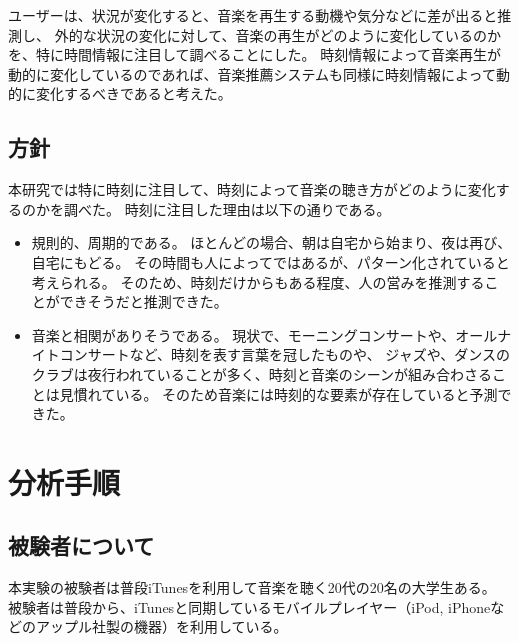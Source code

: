 \documentclass[11pt, onecolumn]{jsarticle}
\begin{document}
ユーザーは、状況が変化すると、音楽を再生する動機や気分などに差が出ると推測し、
外的な状況の変化に対して、音楽の再生がどのように変化しているのかを、特に時間情報に注目して調べることにした。
時刻情報によって音楽再生が動的に変化しているのであれば、音楽推薦システムも同様に時刻情報によって動的に変化するべきであると考えた。

\subsection{方針}
本研究では特に時刻に注目して、時刻によって音楽の聴き方がどのように変化するのかを調べた。
時刻に注目した理由は以下の通りである。
\begin{itemize}
\item
規則的、周期的である。
ほとんどの場合、朝は自宅から始まり、夜は再び、自宅にもどる。
その時間も人によってではあるが、パターン化されていると考えられる。
そのため、時刻だけからもある程度、人の営みを推測することができそうだと推測できた。
\item
音楽と相関がありそうである。
現状で、モーニングコンサートや、オールナイトコンサートなど、時刻を表す言葉を冠したものや、
ジャズや、ダンスのクラブは夜行われていることが多く、時刻と音楽のシーンが組み合わさることは見慣れている。
そのため音楽には時刻的な要素が存在していると予測できた。
\end{itemize}



\section{分析手順}
\subsection{被験者について}
本実験の被験者は普段iTunesを利用して音楽を聴く20代の20名の大学生ある。
被験者は普段から、iTunesと同期しているモバイルプレイヤー（iPod, iPhoneなどのアップル社製の機器）を利用している。
\end{document}
